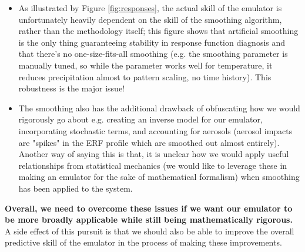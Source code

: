 \begin{itemize}
  \item As illustrated by Figure \ref{fig:responses}, the actual skill of the emulator is unfortunately heavily dependent on the skill of the smoothing algorithm, rather than the methodology itself; this figure shows that artificial smoothing is the only thing guaranteeing stability in response function diagnosis and that there's no one-size-fits-all smoothing (e.g. the smoothing parameter is manually tuned, so while the parameter works well for temperature, it reduces precipitation almost to pattern scaling, no time history). This robustness is the major issue!
  \item The smoothing also has the additional drawback of obfuscating how we would rigorously go about e.g. creating an inverse model for our emulator, incorporating stochastic terms, and accounting for aerosols (aerosol impacts are "spikes" in the ERF profile which are smoothed out almost entirely). Another way of saying this is that, it is unclear how we would apply useful relationships from statistical mechanics (we would like to leverage these in making an emulator for the sake of mathematical formalism) when smoothing has been applied to the system.
\end{itemize}
\textbf{Overall, we need to overcome these issues if we want our emulator to be more broadly applicable while still being mathematically rigorous.} A side effect of this pursuit is that we should also be able to improve the overall predictive skill of the emulator in the process of making these improvements.

\clearpage

